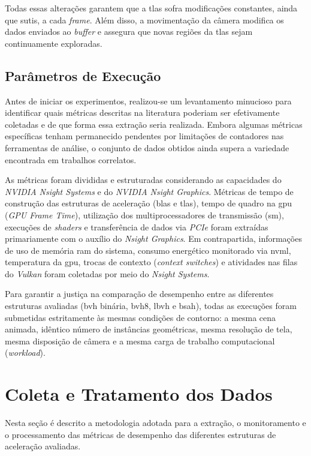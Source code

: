 Todas essas alterações garantem que a \gls{tlas} sofra modificações constantes, ainda que sutis, a cada \textit{frame}. Além disso, a movimentação da câmera modifica os dados enviados ao \textit{buffer} e assegura que novas regiões da \gls{tlas} sejam continuamente exploradas.

\subsection{Parâmetros de Execução}

Antes de iniciar os experimentos, realizou-se um levantamento minucioso para identificar quais métricas descritas na literatura poderiam ser efetivamente coletadas e de que forma essa extração seria realizada. Embora algumas métricas específicas tenham permanecido pendentes por limitações de contadores nas ferramentas de análise, o conjunto de dados obtidos ainda supera a variedade encontrada em trabalhos correlatos.

As métricas foram divididas e estruturadas considerando as capacidades do \textit{NVIDIA Nsight Systems} e do \textit{NVIDIA Nsight Graphics}. Métricas de tempo de construção das estruturas de aceleração (\gls{blas} e \gls{tlas}), tempo de quadro na \gls{gpu} (\textit{GPU Frame Time}), utilização dos multiprocessadores de transmissão (\gls{sm}), execuções de \textit{shaders} e transferência de dados via \textit{PCIe} foram extraídas primariamente com o auxílio do \textit{Nsight Graphics}. Em contrapartida, informações de uso de memória \gls{ram} do sistema, consumo energético monitorado via \gls{nvml}, temperatura da \gls{gpu}, trocas de contexto (\textit{context switches}) e atividades nas filas do \textit{Vulkan} foram coletadas por meio do \textit{Nsight Systems}.

Para garantir a justiça na comparação de desempenho entre as diferentes estruturas avaliadas (\gls{bvh} binária, \gls{bvh8}, \gls{lbvh} e \gls{bsah}), todas as execuções foram submetidas estritamente às mesmas condições de contorno: a mesma cena animada, idêntico número de instâncias geométricas, mesma resolução de tela, mesma disposição de câmera e a mesma carga de trabalho computacional (\textit{workload}).

\section{Coleta e Tratamento dos Dados}

Nesta seção é descrito a metodologia adotada para a extração, o monitoramento e o processamento das métricas de desempenho das diferentes estruturas de aceleração avaliadas.

